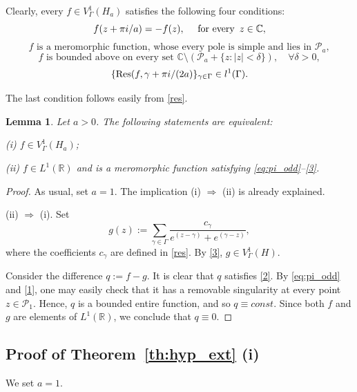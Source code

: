 \documentclass[12pt]{amsart}
\numberwithin{equation}{section}
\theoremstyle{plain}
\newtheorem{lemma}[theorem]{Lemma}
\theoremstyle{definition}
\newcommand{\R}{{\mathbb R}} \newcommand{\Q}{{\mathbb Q}} \newcommand{\Z}{{\mathbb Z}} \newcommand{\N}{{\mathbb N}}
\newcommand{\Cc}{{\mathbb C}}
\def\res{\mathop{{\rm Res}}\limits}
\begin{document}
 
Clearly, every $f\in V^1_{\Gamma}(H_a)$ satisfies the following four conditions: 
\begin{equation}\label{eq:pi_odd}
    f(z+\pi i/a) = -f(z), \quad \text{ for every \,} z \in \Cc,
\end{equation}
 \begin{equation}\label{1} f \text{ is a meromorphic function, whose every pole is simple and lies in } \mathcal{P}_a,  \end{equation} 
 \begin{equation}\label{2}
 f\text{ is bounded  above on every set }
    \mathbb C\setminus \left(\mathcal{P}_a+\{z:|z|<\delta\}\right) ,\quad \forall\delta>0,
 \end{equation} 
\begin{equation}\label{3}
\{\res(f,\gamma+ \pi i/(2a)\}_{\gamma \in \Gamma}\in l^1(\Gamma).
 \end{equation}


 The last condition follows easily from \eqref{res}.
 
\begin{lemma}\label{lem:secant_represent}
Let $a>0$. The following statements are equivalent:

{\rm(i)}  $f\in V^1_\Gamma(H_a)${\rm ;} 

{\rm(ii)} $f\in L^1(\R) $ and is a meromorphic function satisfying  \eqref{eq:pi_odd}--\eqref{3}.
\end{lemma}
\begin{proof}
As usual, set $a=1.$
The implication (i) $\Rightarrow$ (ii) is already explained.


   (ii) $\Rightarrow$ (i). Set
   $$g(z):=\sum_{\gamma\in\Gamma}\frac{c_\gamma}{e^{(z-\gamma)}+e^{(\gamma-z)}},$$where the coefficients $c_\gamma$ are defined in \eqref{res}. By  \eqref{3}, $g\in V^1_{\Gamma}(H)$. 
   
   Consider the difference $q:=f-g$. It is clear that $q$ satisfies \eqref{2}.  By \eqref{eq:pi_odd} and \eqref{1}, one may easily check that it has a removable singularity at every point $z\in \mathcal{P}_1$.  Hence, $q$ is a bounded entire function, and so $q\equiv const$. Since both $f$ and $g$ are elements of  $L^1(\R)$, we conclude that $q\equiv0.$
\end{proof}



\subsection{Proof of Theorem~\ref{th:hyp_ext} (i)}\label{s42}
We set $a=1$.
\end{document}
